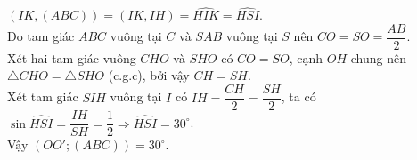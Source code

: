 \begin{ex}[Sở Hà Nội 2019]
{{\begin{tikzpicture}[line join=round,line cap=round, font=\footnotesize,scale=1,>=stealth]
            \end{tikzpicture}
        }
        \noindent $\left(IK,(ABC)\right)=(IK,IH)=\widehat{HIK}=\widehat{HSI}$.\\
        Do tam giác $ABC$ vuông tại $C$ và $SAB$ vuông tại $S$ nên $CO=SO=\dfrac{AB}{2}$.\\
        Xét hai tam giác vuông $CHO$ và $SHO$ có $CO=SO$, cạnh $OH$ chung nên\\
        $\triangle CHO=\triangle SHO$ (c.g.c), bởi vậy $CH=SH$.\\
        Xét tam giác $SIH$ vuông tại $I$ có $IH=\dfrac{CH}{2}=\dfrac{SH}{2}$, ta có $\sin\widehat{HSI}=\dfrac{IH}{SH}=\dfrac{1}{2}\Rightarrow\widehat{HSI}=30^{\circ}$.\\
        Vậy $\left(OO';(ABC)\right)=30^{\circ}$.
    }
\end{ex}

